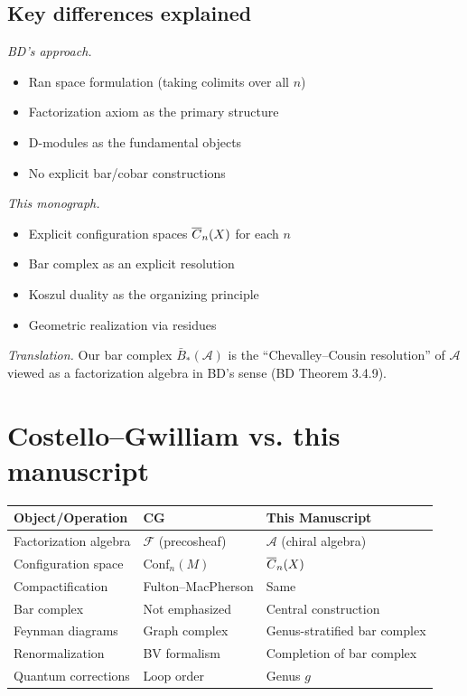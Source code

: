 \subsection{Key differences explained}

\emph{BD's approach.}
\begin{itemize}
\item Ran space formulation (taking colimits over all $n$)
\item Factorization axiom as the primary structure
\item D-modules as the fundamental objects
\item No explicit bar/cobar constructions
\end{itemize}

\emph{This monograph.}
\begin{itemize}
\item Explicit configuration spaces $\overline{C}_{n}(X)$ for each $n$
\item Bar complex as an explicit resolution
\item Koszul duality as the organizing principle
\item Geometric realization via residues
\end{itemize}

\emph{Translation.} Our bar complex $\bar{B}_*(\mathcal{A})$ is the ``Chevalley--Cousin resolution'' of $\mathcal{A}$ viewed as a factorization algebra in BD's sense (BD Theorem 3.4.9).

\section{Costello--Gwilliam vs. this manuscript}

\begin{center}
\begin{tabular}{|>{\raggedright\arraybackslash}p{5.8cm}|>{\raggedright\arraybackslash}p{3.9cm}|>{\raggedright\arraybackslash}p{3.9cm}|}
\hline
\textbf{Object/Operation} & \textbf{CG \cite{CG17}} & \textbf{This Manuscript} \\
\hline
Factorization algebra & $\mathcal{F}$ (precosheaf) & $\mathcal{A}$ (chiral algebra) \\
Configuration space & $\text{Conf}_n(M)$ & $\overline{C}_{n}(X)$ \\
Compactification & Fulton--MacPherson & Same \\
Bar complex & Not emphasized & Central construction \\
Feynman diagrams & Graph complex & Genus-stratified bar complex \\
Renormalization & BV formalism & Completion of bar complex \\
Quantum corrections & Loop order & Genus $g$ \\
\hline
\end{tabular}
\end{center}

